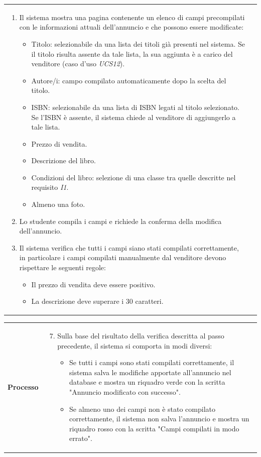 \documentclass[10pt,a4paper]{report}
\begin{document}
\begin{tabular}{lp{}}
\begin{enumerate}
			
			\item Il sistema mostra una pagina contenente un elenco di campi precompilati con le informazioni attuali dell'annuncio e che possono essere modificate:
			\begin{itemize}
				\item Titolo: selezionabile da una lista dei titoli già presenti nel sistema. Se il titolo risulta assente da tale lista, la sua aggiunta è a carico del venditore (caso d'uso \textit{UCS12}).
				\item Autore/i: campo compilato automaticamente dopo la scelta del titolo.
				\item ISBN: selezionabile da una lista di ISBN legati al titolo selezionato. Se l'ISBN è assente, il sistema chiede al venditore di aggiungerlo a tale lista.
				\item Prezzo di vendita.
				\item Descrizione del libro.
				\item Condizioni del libro: selezione di una classe tra quelle descritte nel requisito \textit{I1}.
				\item Almeno una foto.
			\end{itemize}
			\item Lo studente compila i campi e richiede la conferma della modifica dell'annuncio.
			\item Il sistema verifica che tutti i campi siano stati compilati correttamente, in particolare i campi compilati manualmente dal venditore devono rispettare le seguenti regole:
			\begin{itemize}
				\item Il prezzo di vendita deve essere positivo.
				\item La descrizione deve superare i 30 caratteri.
			\end{itemize}
		\end{enumerate}
	\end{tabular}
	
	\begin{tabular}{lp{}}
		\textbf{Processo}&\begin{enumerate}
			\setcounter{enumi}{6}
			\item Sulla base del risultato della verifica descritta al passo precedente, il sistema si comporta in modi diversi:
			\begin{itemize}
				\item Se tutti i campi sono stati compilati correttamente, il sistema salva le modifiche apportate all'annuncio nel database e mostra un riquadro verde con la scritta "Annuncio modificato con successo".
				\item Se almeno uno dei campi non è stato compilato correttamente, il sistema non salva l'annuncio e mostra un riquadro rosso con la scritta "Campi compilati in modo errato".
			\end{itemize}
		\end{enumerate}
	\end{tabular}
	
\end{document}

